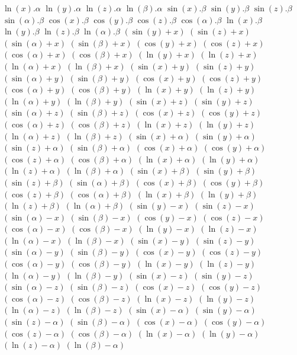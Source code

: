 $ \ln(x) . \alpha $
$ \ln(y) . \alpha $
$ \ln(z) . \alpha $
$ \ln(\beta) . \alpha $
$ \sin(x) . \beta $
$ \sin(y) . \beta $
$ \sin(z) . \beta $
$ \sin(\alpha) . \beta $
$ \cos(x) . \beta $
$ \cos(y) . \beta $
$ \cos(z) . \beta $
$ \cos(\alpha) . \beta $
$ \ln(x) . \beta $
$ \ln(y) . \beta $
$ \ln(z) . \beta $
$ \ln(\alpha) . \beta $
$ (\sin(y) + x) $
$ (\sin(z) + x) $
$ (\sin(\alpha) + x) $
$ (\sin(\beta) + x) $
$ (\cos(y) + x) $
$ (\cos(z) + x) $
$ (\cos(\alpha) + x) $
$ (\cos(\beta) + x) $
$ (\ln(y) + x) $
$ (\ln(z) + x) $
$ (\ln(\alpha) + x) $
$ (\ln(\beta) + x) $
$ (\sin(x) + y) $
$ (\sin(z) + y) $
$ (\sin(\alpha) + y) $
$ (\sin(\beta) + y) $
$ (\cos(x) + y) $
$ (\cos(z) + y) $
$ (\cos(\alpha) + y) $
$ (\cos(\beta) + y) $
$ (\ln(x) + y) $
$ (\ln(z) + y) $
$ (\ln(\alpha) + y) $
$ (\ln(\beta) + y) $
$ (\sin(x) + z) $
$ (\sin(y) + z) $
$ (\sin(\alpha) + z) $
$ (\sin(\beta) + z) $
$ (\cos(x) + z) $
$ (\cos(y) + z) $
$ (\cos(\alpha) + z) $
$ (\cos(\beta) + z) $
$ (\ln(x) + z) $
$ (\ln(y) + z) $
$ (\ln(\alpha) + z) $
$ (\ln(\beta) + z) $
$ (\sin(x) + \alpha) $
$ (\sin(y) + \alpha) $
$ (\sin(z) + \alpha) $
$ (\sin(\beta) + \alpha) $
$ (\cos(x) + \alpha) $
$ (\cos(y) + \alpha) $
$ (\cos(z) + \alpha) $
$ (\cos(\beta) + \alpha) $
$ (\ln(x) + \alpha) $
$ (\ln(y) + \alpha) $
$ (\ln(z) + \alpha) $
$ (\ln(\beta) + \alpha) $
$ (\sin(x) + \beta) $
$ (\sin(y) + \beta) $
$ (\sin(z) + \beta) $
$ (\sin(\alpha) + \beta) $
$ (\cos(x) + \beta) $
$ (\cos(y) + \beta) $
$ (\cos(z) + \beta) $
$ (\cos(\alpha) + \beta) $
$ (\ln(x) + \beta) $
$ (\ln(y) + \beta) $
$ (\ln(z) + \beta) $
$ (\ln(\alpha) + \beta) $
$ (\sin(y) - x) $
$ (\sin(z) - x) $
$ (\sin(\alpha) - x) $
$ (\sin(\beta) - x) $
$ (\cos(y) - x) $
$ (\cos(z) - x) $
$ (\cos(\alpha) - x) $
$ (\cos(\beta) - x) $
$ (\ln(y) - x) $
$ (\ln(z) - x) $
$ (\ln(\alpha) - x) $
$ (\ln(\beta) - x) $
$ (\sin(x) - y) $
$ (\sin(z) - y) $
$ (\sin(\alpha) - y) $
$ (\sin(\beta) - y) $
$ (\cos(x) - y) $
$ (\cos(z) - y) $
$ (\cos(\alpha) - y) $
$ (\cos(\beta) - y) $
$ (\ln(x) - y) $
$ (\ln(z) - y) $
$ (\ln(\alpha) - y) $
$ (\ln(\beta) - y) $
$ (\sin(x) - z) $
$ (\sin(y) - z) $
$ (\sin(\alpha) - z) $
$ (\sin(\beta) - z) $
$ (\cos(x) - z) $
$ (\cos(y) - z) $
$ (\cos(\alpha) - z) $
$ (\cos(\beta) - z) $
$ (\ln(x) - z) $
$ (\ln(y) - z) $
$ (\ln(\alpha) - z) $
$ (\ln(\beta) - z) $
$ (\sin(x) - \alpha) $
$ (\sin(y) - \alpha) $
$ (\sin(z) - \alpha) $
$ (\sin(\beta) - \alpha) $
$ (\cos(x) - \alpha) $
$ (\cos(y) - \alpha) $
$ (\cos(z) - \alpha) $
$ (\cos(\beta) - \alpha) $
$ (\ln(x) - \alpha) $
$ (\ln(y) - \alpha) $
$ (\ln(z) - \alpha) $
$ (\ln(\beta) - \alpha) $
